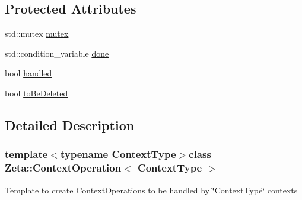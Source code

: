 \subsection*{Protected Attributes}
\begin{DoxyCompactItemize}
\item 
std\+::mutex \hyperlink{classZeta_1_1ContextOperation_a38829d81157a6de9612f541d86215a68}{mutex}
\item 
std\+::condition\+\_\+variable \hyperlink{classZeta_1_1ContextOperation_a19abe2b5eb5218526a7e8823aec107a4}{done}
\item 
bool \hyperlink{classZeta_1_1ContextOperation_a015a74ff36e2bc7d9b949ad8d12d7ca1}{handled}
\item 
bool \hyperlink{classZeta_1_1ContextOperation_a74d249e9f1614a29999b811772a41c1b}{to\+Be\+Deleted}
\end{DoxyCompactItemize}


\subsection{Detailed Description}
\subsubsection*{template$<$typename Context\+Type$>$class Zeta\+::\+Context\+Operation$<$ Context\+Type $>$}

Template to create Context\+Operations to be handled by \char`\"{}\+Context\+Type\char`\"{} contexts 

